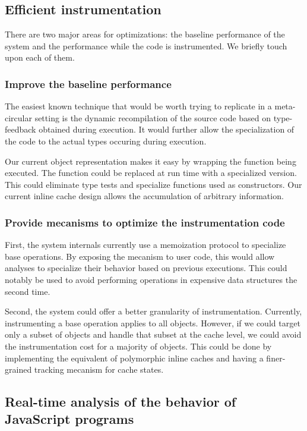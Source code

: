 \subsection{Efficient instrumentation}

There are two major areas for optimizations: the baseline performance of the
system and the performance while the code is instrumented. We briefly touch
upon each of them. 

\subsubsection{Improve the baseline performance}

The easiest known technique that would be worth trying to replicate in a
meta-circular setting is the dynamic recompilation of the source code based on
type-feedback obtained during execution. It would further allow the
specialization of the code to the actual types occuring during execution.

Our current object representation makes it easy by wrapping the function being
executed.  The function could be replaced at run time with a specialized
version. This could eliminate type tests and specialize functions used as
constructors. Our current inline cache design allows the accumulation of
arbitrary information.

\subsubsection{Provide mecanisms to optimize the instrumentation code}

First, the system internals currently use a memoization protocol to specialize base
operations. By exposing the mecanism to user code, this would allow analyses to
specialize their behavior based on previous executions. This could notably be
used to avoid performing operations in expensive data structures the second
time.

Second, the system could offer a better granularity of instrumentation.
Currently, instrumenting a base operation applies to all objects. However, if
we could target only a subset of objects and handle that subset at the cache
level, we could avoid the instrumentation cost for a majority of objects. This
could be done by implementing the equivalent of polymorphic inline caches and
having a finer-grained tracking mecanism for cache states.

\subsection{Real-time analysis of the behavior of JavaScript programs}

